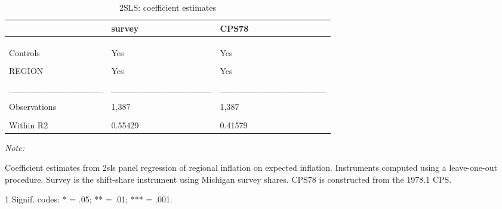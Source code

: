 \begin{table}

\caption{\label{tab:base:out:2sls:stage2}2SLS: coefficient estimates}
\centering
\begin{threeparttable}
\begin{tabular}[t]{lll}
\toprule
  & survey & CPS78\\
\midrule
\cellcolor{gray!6}{Dependent Var.:} & \cellcolor{gray!6}{RegInf} & \cellcolor{gray!6}{RegInf}\\
\addlinespace
 &  & \\
\addlinespace
\cellcolor{gray!6}{pe} & \cellcolor{gray!6}{0.3351* (0.1406)} & \cellcolor{gray!6}{0.5465** (0.1939)}\\
\addlinespace
Controls & Yes & Yes\\
\addlinespace
\cellcolor{gray!6}{Fixed-Effects:} & \cellcolor{gray!6}{----------------} & \cellcolor{gray!6}{-----------------}\\
\addlinespace
REGION & Yes & Yes\\
\addlinespace
\cellcolor{gray!6}{TIME} & \cellcolor{gray!6}{Yes} & \cellcolor{gray!6}{Yes}\\
\addlinespace
\_\_\_\_\_\_\_\_\_\_\_\_\_\_\_ & \_\_\_\_\_\_\_\_\_\_\_\_\_\_\_\_ & \_\_\_\_\_\_\_\_\_\_\_\_\_\_\_\_\_\\
\addlinespace
\cellcolor{gray!6}{S.E. type} & \cellcolor{gray!6}{Dris.-Kra. (L=4)} & \cellcolor{gray!6}{Drisc.-Kra. (L=4)}\\
\addlinespace
Observations & 1,387 & 1,387\\
\addlinespace
\cellcolor{gray!6}{R2} & \cellcolor{gray!6}{0.95399} & \cellcolor{gray!6}{0.93969}\\
\addlinespace
Within R2 & 0.55429 & 0.41579\\
\bottomrule
\end{tabular}
\begin{tablenotes}
\item \textit{Note: } 
\item Coefficient estimates from 2sls panel regression of regional inflation on expected inflation. Instruments computed using a leave-one-out procedure. Survey is the shift-share instrument using Michigan survey shares. CPS78 is constructed from the 1978.1 CPS.
\item[1] Signif. codes: * = .05; ** = .01; *** = .001.
\end{tablenotes}
\end{threeparttable}
\end{table}
